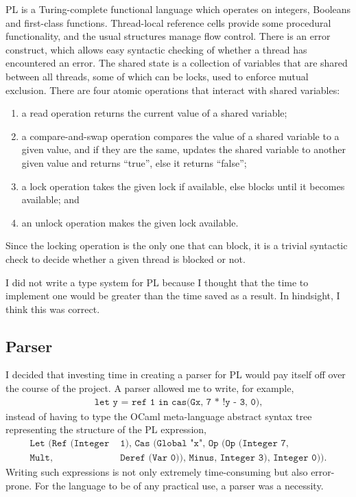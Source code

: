 \documentclass[12pt,a4paper,twoside,openany]{report}
\begin{document}
PL is a Turing-complete functional
language which operates on integers,
Booleans and first-class functions.
Thread-local reference cells provide some
procedural functionality, and the usual
structures manage flow control. There is
an error construct, which allows easy syntactic
checking of whether a thread has encountered
an error. The shared
state is a collection of variables that are
shared between all threads, some of which
can be locks, used to enforce mutual exclusion.
There are four atomic operations
that interact with shared variables:
\begin{enumerate}
	\item a read operation returns the current value
	of a shared variable;
	\item a compare-and-swap operation
	compares the value of a shared variable to a
	given value, and if they are the same, updates
	the shared variable to another given value and returns
	``true'', else it returns ``false'';
	\item a lock operation takes the given lock if
	available, else blocks until it becomes available; and
	\item an unlock operation makes the given lock
	available.
\end{enumerate}
Since the locking operation is the only
one that can block, it is a trivial syntactic
check to decide whether a given thread is
blocked or not.

I did not write a type system for PL because
I thought that the time to implement one would
be greater than the time saved as a result. In hindsight,
I think this was correct.

\subsection{Parser}
I decided that investing time in creating a
parser for PL would pay itself off over the course of the project.
A parser allowed me to write, for example,
\begin{align*}
	\texttt{let y = ref 1 in cas(Gx, 7 * !y - 3, 0)},
\end{align*}
instead of having to type the OCaml meta-language abstract
syntax tree representing the structure of the PL expression,
\begin{align*}
	\texttt{Let (Ref (Integer}& \texttt{ 1), Cas (Global "x",
		Op (Op (Integer 7,} \\ \texttt{Mult,}& \texttt{ Deref (Var 0)), Minus, Integer 3),
		Integer 0))}.
\end{align*}
Writing such expressions is not only extremely time-consuming but
also error-prone. For the language to be of any practical use,
a parser was a necessity.
\end{document}
